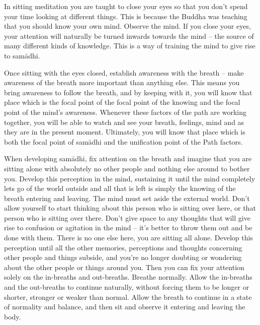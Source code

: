 In sitting meditation you are taught to close your eyes so that you don't spend your time looking at different things. This is because the Buddha was teaching that you should know your own mind. Observe the mind. If you close your eyes, your attention will naturally be turned inwards towards the mind -- the source of many different kinds of knowledge. This is a way of training the mind to give rise to sam\=adhi.

Once sitting with the eyes closed, establish awareness with the breath -- make awareness of the breath more important than anything else. This means you bring awareness to follow the breath, and by keeping with it, you will know that place which is the focal point of  the focal point of the knowing and the focal point of the mind's awareness. Whenever these factors of the path are working together, you will be able to watch and see your breath, feelings, mind and  as they are in the present moment. Ultimately, you will know that place which is both the focal point of sam\=adhi and the unification point of the Path factors.

When developing sam\=adhi, fix attention on the breath and imagine that you are sitting alone with absolutely no other people and nothing else around to bother you. Develop this perception in the mind, sustaining it until the mind completely lets go of the world outside and all that is left is simply the knowing of the breath entering and leaving. The mind must set aside the external world. Don't allow yourself to start thinking about this person who is sitting over here, or that person who is sitting over there. Don't give space to any thoughts that will give rise to confusion or agitation in the mind -- it's better to throw them out and be done with them. There is no one else here, you are sitting all alone. Develop this perception until all the other memories, perceptions and thoughts concerning other people and things subside, and you're no longer doubting or wondering about the other people or things around you. Then you can fix your attention solely on the in-breaths and out-breaths. Breathe normally. Allow the in-breaths and the out-breaths to continue naturally, without forcing them to be longer or shorter, stronger or weaker than normal. Allow the breath to continue in a state of normality and balance, and then sit and observe it entering and leaving the body.

